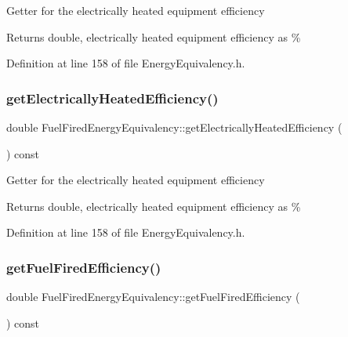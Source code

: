 Getter for the electrically heated equipment efficiency

\begin{DoxyReturn}{Returns}
double, electrically heated equipment efficiency as \% 
\end{DoxyReturn}


Definition at line 158 of file Energy\+Equivalency.\+h.

\mbox{\label{class_fuel_fired_energy_equivalency_ad4bd750677313895d8345c7eaf8308bd}} 
\subsubsection{\texorpdfstring{get\+Electrically\+Heated\+Efficiency()}{getElectricallyHeatedEfficiency()}\hspace{0.1cm}{\footnotesize\ttfamily [3/3]}}
{\footnotesize\ttfamily double Fuel\+Fired\+Energy\+Equivalency\+::get\+Electrically\+Heated\+Efficiency (\begin{DoxyParamCaption}{ }\end{DoxyParamCaption}) const\hspace{0.3cm}{\ttfamily [inline]}}

Getter for the electrically heated equipment efficiency

\begin{DoxyReturn}{Returns}
double, electrically heated equipment efficiency as \% 
\end{DoxyReturn}


Definition at line 158 of file Energy\+Equivalency.\+h.

\mbox{\label{class_fuel_fired_energy_equivalency_ac8695c1fe3dcffeab60b5305239d2a58}} 
\subsubsection{\texorpdfstring{get\+Fuel\+Fired\+Efficiency()}{getFuelFiredEfficiency()}\hspace{0.1cm}{\footnotesize\ttfamily [1/3]}}
{\footnotesize\ttfamily double Fuel\+Fired\+Energy\+Equivalency\+::get\+Fuel\+Fired\+Efficiency (\begin{DoxyParamCaption}{ }\end{DoxyParamCaption}) const\hspace{0.3cm}{\ttfamily [inline]}}

